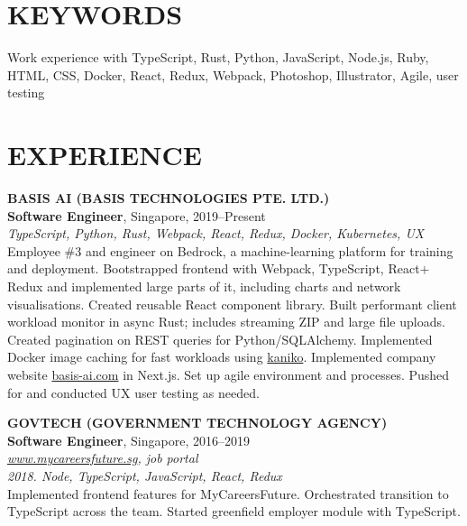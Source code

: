 \documentclass[line, margin]{res}
\makeatletter
\newcommand{\at}[0]{@}
\makeatother
\begin{document}
\address{
    \href{mailto:ng.guoyou+cv\at gmail.com}{ng.guoyou\at gmail.com}
    \href{https://github.com/gyng}{github.com/gyng}
}

\begin{resume}
    \section{KEYWORDS}
        Work experience with TypeScript, Rust, Python, JavaScript, Node.js, Ruby, HTML, CSS, Docker, React, Redux, Webpack, Photoshop, Illustrator, Agile, user testing

    \section{EXPERIENCE}
        \textbf{BASIS AI (BASIS TECHNOLOGIES PTE. LTD.)} \\
        \textbf{Software Engineer}, Singapore, 2019--Present \\
        \textit{TypeScript, Python, Rust, Webpack, React, Redux, Docker, Kubernetes, UX} \\
        Employee \#3 and engineer on Bedrock, a machine-learning platform for training and deployment.
        Bootstrapped frontend with Webpack, TypeScript, React$+$Redux and implemented large parts of it, including charts and network visualisations. Created reusable React component library.
        Built performant client workload monitor in async Rust; includes streaming ZIP and large file uploads. Created pagination on REST queries for Python/SQLAlchemy.
        Implemented Docker image caching for fast workloads using \href{https://github.com/GoogleContainerTools/kaniko}{kaniko}.
        Implemented company website \href{https://basis-ai.com/}{basis-ai.com} in Next.js.
        Set up agile environment and processes. Pushed for and conducted UX user testing as needed.

        \textbf{GOVTECH (GOVERNMENT TECHNOLOGY AGENCY)} \\
        \textbf{Software Engineer}, Singapore, 2016--2019
        \\
        \textit{\href{https://www.mycareersfuture.sg}{www.mycareersfuture.sg}, job portal} \\
        \textit{2018. Node, TypeScript, JavaScript, React, Redux} \\
        Implemented frontend features for MyCareersFuture. Orchestrated transition to TypeScript across the team. Started greenfield employer module with TypeScript.


\end{resume}
\end{document}
